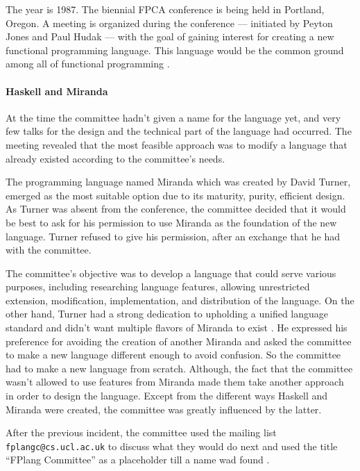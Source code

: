 \documentclass[a4paper, titlepage, twoside]{article}
\begin{document}
The year is 1987. The biennial FPCA conference is being held in Portland, Oregon. A meeting is organized during the conference --- initiated by Peyton Jones and Paul Hudak --- with the goal of gaining interest for creating a new functional programming language. This language would be the common ground among all of functional programming \autocite{hudakHistoryHaskellBeing2007}.

\paragraph*{Haskell and Miranda}
\label{sec:org855ad6f}

At the time the committee hadn't given a name for the language yet, and very few talks for the design and the technical part of the language had occurred. The meeting revealed that the most feasible approach was to modify a language that already existed according to the committee's needs.

The programming language named Miranda \autocite{turnerMirandaNonstrictFunctional1985} which was created by David Turner, emerged as the most suitable option due to its maturity, purity, efficient design. As Turner was absent from the conference, the committee decided that it would be best to ask for his permission to use Miranda as the foundation of the new language. Turner refused to give his permission, after an exchange that he had with the committee.

The committee's objective was to develop a language that could serve various purposes, including researching language features, allowing unrestricted extension, modification, implementation, and distribution of the language. On the other hand, Turner had a strong dedication to upholding a unified language standard and didn't want multiple flavors of Miranda to exist \autocite{hudakHistoryHaskellBeing2007}. He expressed his preference for avoiding the creation of another Miranda and asked the committee to make a new language different enough to avoid confusion. So the committee had to make a new language from scratch. Although, the fact that the committee wasn't allowed to use features from Miranda made them take another approach in order to design the language. Except from the different ways Haskell and Miranda were created, the committee was greatly influenced by the latter.

After the previous incident, the committee used the mailing list \texttt{fplangc@cs.ucl.ac.uk} to discuss what they would do next and used the title ``FPlang Committee'' as a placeholder till a name wad found \autocite{hudakHistoryHaskellBeing2007}.
\end{document}
